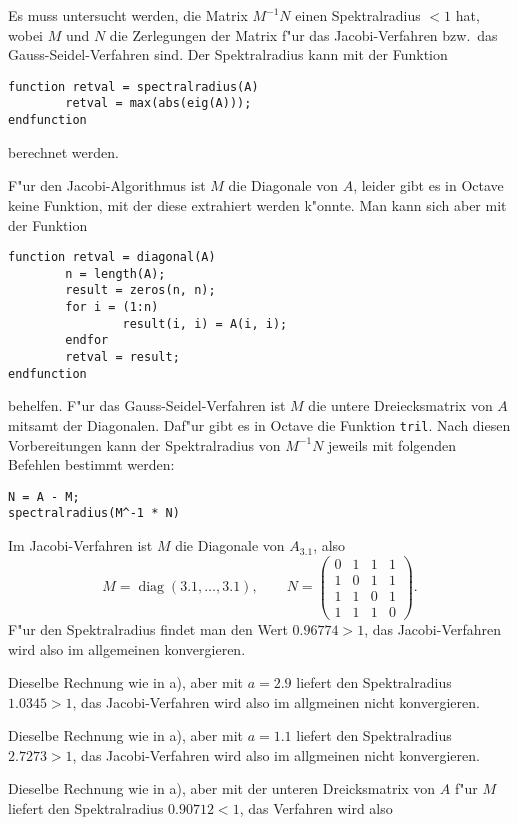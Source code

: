 \begin{loesung}
Es muss untersucht werden, die Matrix $M^{-1}N$ einen Spektralradius $<1$
hat, wobei $M$ und $N$ die Zerlegungen der Matrix f"ur das Jacobi-Verfahren
bzw.~das Gauss-Seidel-Verfahren sind.
Der Spektralradius kann mit der Funktion
\begin{verbatim}
function retval = spectralradius(A)
        retval = max(abs(eig(A)));
endfunction
\end{verbatim}
berechnet werden.

F"ur den Jacobi-Algorithmus ist $M$ die Diagonale von $A$, leider gibt es
in Octave keine Funktion, mit der diese extrahiert werden k"onnte. Man kann
sich aber mit der Funktion
\begin{verbatim}
function retval = diagonal(A)
        n = length(A);
        result = zeros(n, n);
        for i = (1:n)
                result(i, i) = A(i, i);
        endfor
        retval = result;
endfunction
\end{verbatim}
behelfen.
F"ur das Gauss-Seidel-Verfahren ist $M$ die untere Dreiecksmatrix von $A$
mitsamt der Diagonalen. Daf"ur gibt es in Octave die Funktion {\tt tril}.
Nach diesen Vorbereitungen kann der Spektralradius von $M^{-1}N$ jeweils
mit folgenden Befehlen bestimmt werden:
\begin{verbatim}
N = A - M;
spectralradius(M^-1 * N)
\end{verbatim}
\begin{teilaufgaben}
\item Im Jacobi-Verfahren ist $M$ die Diagonale von $A_{3.1}$, also
\[
M=\operatorname{diag}(3.1,\dots,3.1),\qquad
N=
\begin{pmatrix}
0&1&1&1\\
1&0&1&1\\
1&1&0&1\\
1&1&1&0
\end{pmatrix}.
\]
F"ur den Spektralradius findet man den Wert $0.96774>1$, das Jacobi-Verfahren
wird also im allgemeinen konvergieren.
\item Dieselbe Rechnung wie in a), aber mit $a=2.9$ liefert den Spektralradius
$1.0345>1$, das Jacobi-Verfahren wird also im allgmeinen nicht 
konvergieren.
\item Dieselbe Rechnung wie in a), aber mit $a=1.1$ liefert den Spektralradius
$2.7273>1$, das Jacobi-Verfahren wird also im allgmeinen nicht 
konvergieren.
\item Dieselbe Rechnung wie in a), aber mit der unteren Dreicksmatrix von $A$
f"ur $M$ liefert den Spektralradius $0.90712 < 1$, das Verfahren wird also

\end{teilaufgaben}
\end{loesung}
